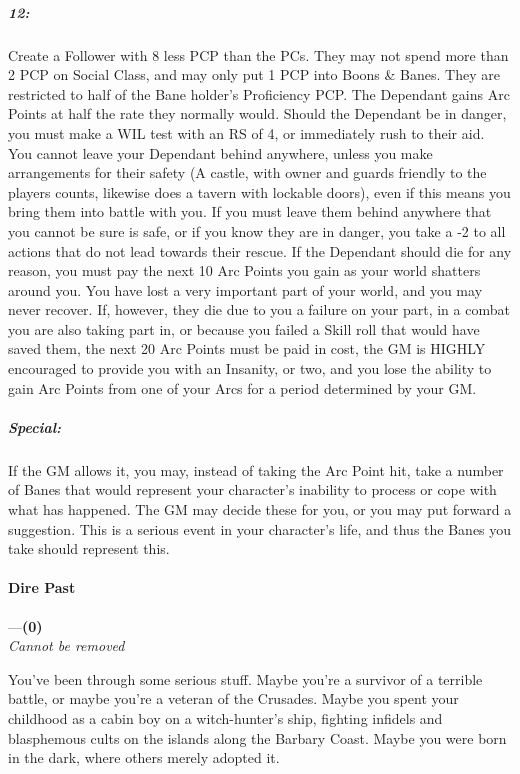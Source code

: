 \documentclass[oneside,11pt,english]{book}
\begin{document}
\subparagraph{12:} Create a Follower with 8 less PCP than the PCs. They may not spend more than 2 PCP on Social Class, and may only put 1 PCP into Boons \& Banes. They are restricted to half of the Bane holder’s Proficiency PCP. The Dependant gains Arc Points at half the rate they normally would. Should the Dependant be in danger, you must make a WIL test with an RS of 4, or immediately rush to their aid. You cannot leave your Dependant behind anywhere, unless you make arrangements for their safety (A castle, with owner and guards friendly to the players counts, likewise does a tavern with lockable doors), even if this means you bring them into battle with you. If you must leave them behind anywhere that you cannot be sure is safe, or if you know they are in danger, you take a -2 to all actions that do not lead towards their rescue. If the Dependant should die for any reason, you must pay the next 10 Arc Points you gain as your world shatters around you. You have lost a very important part of your world, and you may never recover. If, however, they die due to you a failure on your part, in a combat you are also taking part in, or because you failed a Skill roll that would have saved them, the next 20 Arc Points must be paid in cost, the GM is HIGHLY encouraged to provide you with an Insanity, or two, and you lose the ability to gain Arc Points from one of your Arcs for a period determined by your GM.\par

\subparagraph{Special:} If the GM allows it, you may, instead of taking the Arc Point hit, take a number of Banes that would represent your character’s inability to process or cope with what has happened. The GM may decide these for you, or you may put forward a suggestion. This is a serious event in your character’s life, and thus the Banes you take should represent this.
\paragraph{\label{bane:Dire Past}Dire Past}---\quad\textbf{(0) }\\
\emph{Cannot be removed}\par
You've been through some serious stuff. Maybe you're a survivor of a terrible battle, or maybe you're a veteran of the Crusades. Maybe you spent your childhood as a cabin boy on a witch-hunter's ship, fighting infidels and blasphemous cults on the islands along the Barbary Coast. Maybe you were born in the dark, where others merely adopted it.
\end{document}
